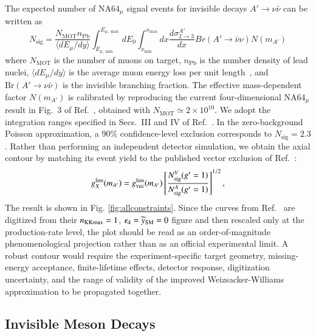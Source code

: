 \documentclass[onecolumn, aps, nofootinbib, prd, preprint, floats, floatfix, amsmath, amssymb, superscriptaddress, preprintnumbers]{revtex4-2}
\begin{document}
The expected number of NA64$_\mu$ signal events for invisible decays $A'\to\nu\bar\nu$ can be written as
\begin{equation}
N_{\text{sig}} = \frac{N_{\text{MOT}} n_{\text{Pb}}}{\langle dE_\mu/dy \rangle} \int_{E_{\mu,\min}}^{E_{\mu,\max}} dE_0 \int_{x_{\min}}^{x_{\max}} dx \frac{d\sigma_{2\to3}^{A'}}{dx} Br(A' \to \bar{\nu}\nu) N(m_{A'})
\label{eq:NA64Signal}
\end{equation}
where $N_{\text{MOT}}$ is the number of muons on target, $n_{\text{Pb}}$ is the number density of lead nuclei, $\langle dE_\mu/dy\rangle$ is the average muon energy loss per unit length~\cite{navas2024review}, and $\mathrm{Br}(A'\to\nu\bar\nu)$ is the invisible branching fraction. The effective mass-dependent factor $N(m_{A'})$ is calibrated by reproducing the current four-dimensional NA64$_\mu$ result in Fig.~3 of Ref.~\cite{andreev2024exploration}, obtained with $N_{\text{MOT}}\simeq2\times10^{10}$. We adopt the integration ranges specified in Secs.~III and IV of Ref.~\cite{Chakraborty:2025jbd}. In the zero-background Poisson approximation, a 90\% confidence-level exclusion corresponds to $N_{\text{sig}}=2.3$. Rather than performing an independent detector simulation, we obtain the axial contour by matching its event yield to the published vector exclusion of Ref.~\cite{Chakraborty:2025jbd}:
\begin{equation}
g_X^{\rm lim}(m_{A'})
=g_{\rm vec}^{\rm lim}(m_{A'})
\left[
\frac{N_{\text{sig}}^V(g'=1)}{N_{\text{sig}}^A(g'=1)}
\right]^{1/2},
\label{eq:beamdump-rescale}
\end{equation}
The result is shown in Fig. \ref{fig:allconstraints}. Since the curves from Ref.~\cite{Chakraborty:2025jbd} are digitized from their $n_{\rm KKmax}=1$, $\epsilon_4=\widetilde y_{\rm SM}=0$ figure and then rescaled only at the production-rate level, the plot should be read as an order-of-magnitude phenomenological projection rather than as an official experimental limit. A robust contour would require the experiment-specific target geometry, missing-energy acceptance, finite-lifetime effects, detector response, digitization uncertainty, and the range of validity of the improved Weizsacker-Williams approximation to be propagated together.

\subsection{Invisible Meson Decays}
\label{subsec:pion-invisible}
\end{document}
